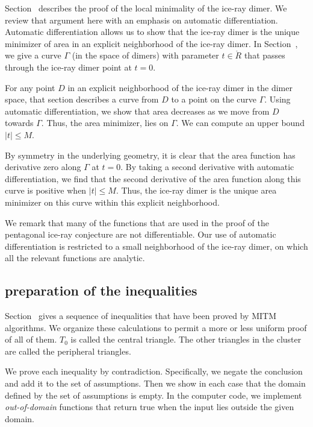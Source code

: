 Section~ describes the proof of the local
minimality of the ice-ray dimer.  We review that argument here with an
emphasis on automatic differentiation.  Automatic differentiation
allows us to show that the ice-ray dimer is the unique minimizer of
area in an explicit neighborhood of the ice-ray dimer.  In
Section~, we give a curve $\Gamma$ (in the space
of dimers) with parameter $t\in\ring{R}$ that passes through the
ice-ray dimer point at $t=0$.

For any point $D$ in an explicit neighborhood of the ice-ray dimer in
the dimer space, that section describes a curve from $D$ to a point on
the curve $\Gamma$.  Using automatic differentiation, we show that
area decreases as we move from $D$ towards $\Gamma$.  Thus, the area
minimizer, lies on $\Gamma$.  We can compute an upper bound $|t|\le
M$.

By symmetry in the underlying geometry, it is clear that the area
function has derivative zero along $\Gamma$ at $t=0$. By taking a
second derivative with automatic differentiation, we find that the
second derivative of the area function along this curve is positive
when $|t|\le M$.  Thus, the ice-ray dimer is the unique area minimizer
on this curve within this explicit neighborhood.

We remark that many of the functions that are used in the proof of the
pentagonal ice-ray conjecture are not differentiable.  Our use of
automatic differentiation is restricted to a small neighborhood of the
ice-ray dimer, on which all the relevant functions are analytic.

\subsection{preparation of the inequalities}

Section~ gives a sequence of inequalities that have been
proved by MITM algorithms.  We organize these calculations to permit a
more or less uniform proof of all of them.  $T_0$ is called the
central triangle.  The other triangles in the cluster are called the
peripheral triangles.

We prove each inequality by contradiction. Specifically, we negate the
conclusion and add it to the set of assumptions.  Then we show in each
case that the domain defined by the set of assumptions is empty. In the
computer code, we implement {\it out-of-domain} functions that return
true when the input lies outside the given domain.

